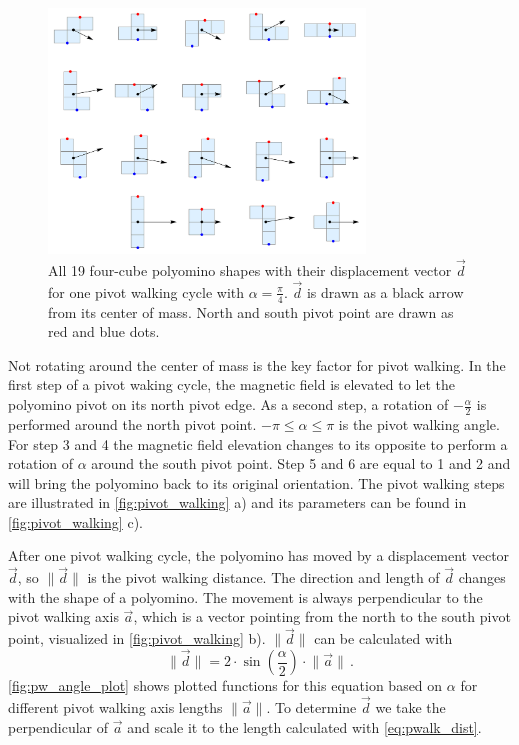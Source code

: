 \begin{figure}
	\centering
	\includegraphics[width=0.75\textwidth]{figures/displacement_pivot_walking.pdf}
	\caption[Polyomino shapes with different displacement vectors]{All 19 four-cube polyomino shapes with their displacement vector $\vec{d}$ for one pivot walking cycle with $\alpha = \frac{\pi}{4}$. $\vec{d}$ is drawn as a black arrow from its center of mass. North and south pivot point are drawn as red and blue dots.}
	\label{fig:displacement_pivot_walking}
\end{figure}

Not rotating around the center of mass is the key factor for pivot walking.
In the first step of a pivot waking cycle, the magnetic field is elevated to let the polyomino pivot on its north pivot edge.
As a second step, a rotation of $-\frac{\alpha}{2}$ is performed around the north pivot point.
$-\pi \leq \alpha \leq \pi$ is the pivot walking angle.
For step 3 and 4 the magnetic field elevation changes to its opposite to perform a rotation of $\alpha$ around the south pivot point.
Step 5 and 6 are equal to 1 and 2 and will bring the polyomino back to its original orientation.
The pivot walking steps are illustrated in \autoref{fig:pivot_walking} a) and its parameters can be found in \autoref{fig:pivot_walking} c).

After one pivot walking cycle, the polyomino has moved by a displacement vector $\vec{d}$, so $\lVert \vec{d} \rVert$ is the pivot walking distance.
The direction and length of $\vec{d}$ changes with the shape of a polyomino.
The movement is always perpendicular to the pivot walking axis $\vec{a}$, which is a vector pointing from the north to the south pivot point, visualized in \autoref{fig:pivot_walking} b).
$\lVert \vec{d} \rVert$ can be calculated with
\begin{equation}\label{eq:pwalk_dist}
\lVert \vec{d} \rVert = 2 \cdot \sin\left(\frac{\alpha}{2} \right) \cdot \lVert \vec{a} \rVert \,.
\end{equation}
\autoref{fig:pw_angle_plot} shows plotted functions for this equation based on $\alpha$ for different pivot walking axis lengths $\lVert \vec{a} \rVert$.
To determine $\vec{d}$ we take the perpendicular of $\vec{a}$ and scale it to the length calculated with \autoref{eq:pwalk_dist}.

